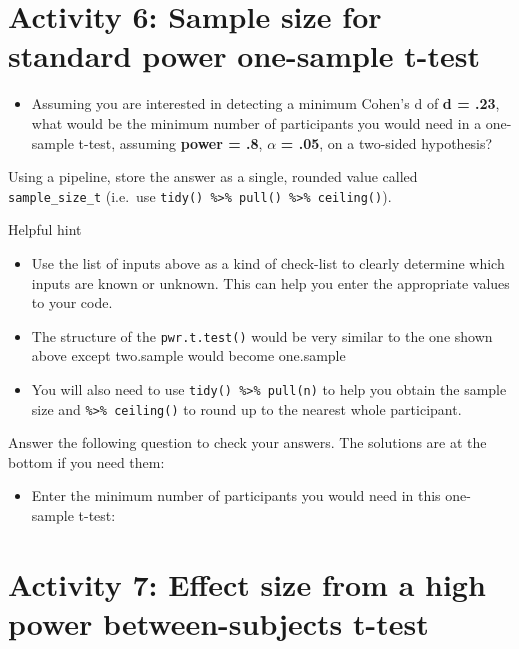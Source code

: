 \documentclass[]{book}
\providecommand{\tightlist}{%
  \setlength{\itemsep}{0pt}\setlength{\parskip}{0pt}}
\begin{document}
\hypertarget{activity-6-sample-size-for-standard-power-one-sample-t-test}{%
\section{Activity 6: Sample size for standard power one-sample t-test}\label{activity-6-sample-size-for-standard-power-one-sample-t-test}}

\begin{itemize}
\tightlist
\item
  Assuming you are interested in detecting a minimum Cohen's d of \textbf{d = .23}, what would be the minimum number of participants you would need in a one-sample t-test, assuming \textbf{power = .8}, \(\alpha\) \textbf{= .05}, on a two-sided hypothesis?
\end{itemize}

Using a pipeline, store the answer as a single, rounded value called \texttt{sample\_size\_t} (i.e.~use \texttt{tidy()\ \%\textgreater{}\%\ pull()\ \%\textgreater{}\%\ ceiling()}).

Helpful hint

\begin{itemize}
\tightlist
\item
  Use the list of inputs above as a kind of check-list to clearly determine which inputs are known or unknown. This can help you enter the appropriate values to your code.
\item
  The structure of the \texttt{pwr.t.test()} would be very similar to the one shown above except two.sample would become one.sample
\item
  You will also need to use \texttt{tidy()\ \%\textgreater{}\%\ pull(n)} to help you obtain the sample size and \texttt{\%\textgreater{}\%\ ceiling()} to round up to the nearest whole participant.
\end{itemize}

Answer the following question to check your answers. The solutions are at the bottom if you need them:

\begin{itemize}
\tightlist
\item
  Enter the minimum number of participants you would need in this one-sample t-test: 
\end{itemize}

\hypertarget{activity-7-effect-size-from-a-high-power-between-subjects-t-test}{%
\section{Activity 7: Effect size from a high power between-subjects t-test}\label{activity-7-effect-size-from-a-high-power-between-subjects-t-test}}
\end{document}
